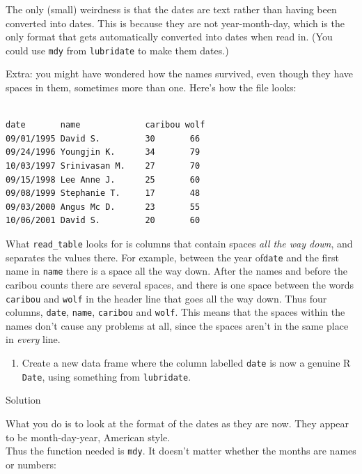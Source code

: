 \documentclass[]{tufte-book}
\providecommand{\tightlist}{%
  \setlength{\itemsep}{0pt}\setlength{\parskip}{0pt}}
\theoremstyle{definition}
\theoremstyle{definition}
\theoremstyle{definition}
\theoremstyle{remark}
\begin{document}
The only (small) weirdness is that the dates are text rather than having
been converted into dates. This is because they are not year-month-day,
which is the only format that gets automatically converted into dates
when read in. (You could use \texttt{mdy} from \texttt{lubridate} to
make them dates.)

Extra: you might have wondered how the names survived, even though they
have spaces in them, sometimes more than one. Here's how the file looks:

\begin{verbatim}

date       name             caribou wolf
09/01/1995 David S.         30       66
09/24/1996 Youngjin K.      34       79
10/03/1997 Srinivasan M.    27       70
09/15/1998 Lee Anne J.      25       60
09/08/1999 Stephanie T.     17       48
09/03/2000 Angus Mc D.      23       55
10/06/2001 David S.         20       60
\end{verbatim}

What \texttt{read\_table} looks for is columns that contain spaces
\emph{all the way down}, and separates the values there. For example,
between the year of\texttt{date} and the first name in \texttt{name}
there is a space all the way down. After the names and before the
caribou counts there are several spaces, and there is one space between
the words \texttt{caribou} and \texttt{wolf} in the header line that
goes all the way down. Thus four columns, \texttt{date}, \texttt{name},
\texttt{caribou} and \texttt{wolf}. This means that the spaces within
the names don't cause any problems at all, since the spaces aren't in
the same place in \emph{every} line.

\begin{enumerate}
\def\labelenumi{(\alph{enumi})}
\setcounter{enumi}{1}
\tightlist
\item
  Create a new data frame where the column labelled \texttt{date} is now
  a genuine R \texttt{Date}, using something from \texttt{lubridate}.
\end{enumerate}

Solution

What you do is to look at the format of the dates as they are now. They
appear to be month-day-year, American style.
\\
Thus the function needed is \texttt{mdy}. It doesn't matter whether the
months are names or numbers:
\end{document}
